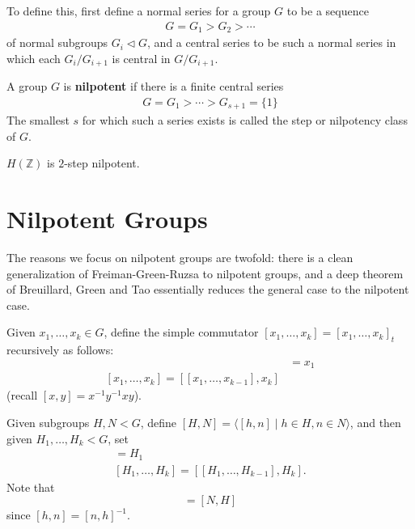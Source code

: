 \documentclass{article}
\newcommand{\named}[1]{\textbf{#1}\index{#1}}
\numberwithin{equation}{section}
\begin{document}
To define this, first define a normal series for a group $G$ to be a sequence
\begin{align*}
  G = G_1 > G_2 > \dotsb
\end{align*}
of normal subgroups $G_i \lhd G$, and a central series to be such a normal series in which each $G_i / G_{i+1}$ is central in $G/G_{i+1}$.
\begin{defi}
  A group $G$ is \named{nilpotent} if there is a finite central series
  \begin{align*}
    G = G_1 > \dotsb > G_{s+1} = \{1\}
  \end{align*}
  The smallest $s$ for which such a series exists is called the step or nilpotency class of $G$.
\end{defi}
\begin{ex}
  $H(\mathbb{Z})$ is $2$-step nilpotent.
\end{ex}

\clearpage
\section{Nilpotent Groups}
\newlec
The reasons we focus on nilpotent groups are twofold: there is a clean generalization of Freiman-Green-Ruzsa to nilpotent groups, and a deep theorem of Breuillard, Green and Tao essentially reduces the general case to the nilpotent case.

Given $x_1, \dotsc, x_k \in G$, define the simple commutator
$[x_1, \dotsc, x_k] = [x_1, \dotsc, x_k]_t$ recursively as follows:
\begin{align*}
  [x_1] &= x_1 \\
  [x_1, \dotsc, x_k] = [[x_1, \dotsc, x_{k-1}], x_k]
\end{align*}
(recall $[x,y] = x^{-1} y^{-1} x y$).

Given subgroups $H,N < G$, define $[H,N] = \langle [h,n] \mid h \in H, n \in N \rangle$, and then given $H_1, \dotsc, H_k < G$, set
\begin{align*}
  [H_1] = H_1 \\
  [H_1, \dotsc, H_k] = [[H_1, \dotsc, H_{k-1}], H_k].
\end{align*}
Note that
\begin{equation}
  [H,N] = [N,H] \label{eq:8.1}
\end{equation}
since $[h,n] = [n,h]^{-1}$.
\end{document}
